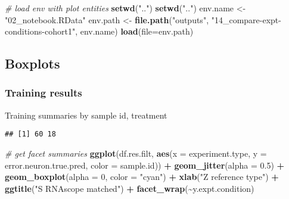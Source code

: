 \documentclass[
]{article}
\newenvironment{Shaded}{\begin{snugshade}}{\end{snugshade}}
\newcommand{\AttributeTok}[1]{\textcolor[rgb]{0.13,0.29,0.53}{#1}}
\newcommand{\CommentTok}[1]{\textcolor[rgb]{0.56,0.35,0.01}{\textit{#1}}}
\newcommand{\DecValTok}[1]{\textcolor[rgb]{0.00,0.00,0.81}{#1}}
\newcommand{\FloatTok}[1]{\textcolor[rgb]{0.00,0.00,0.81}{#1}}
\newcommand{\FunctionTok}[1]{\textcolor[rgb]{0.13,0.29,0.53}{\textbf{#1}}}
\newcommand{\NormalTok}[1]{#1}
\newcommand{\OtherTok}[1]{\textcolor[rgb]{0.56,0.35,0.01}{#1}}
\newcommand{\SpecialCharTok}[1]{\textcolor[rgb]{0.81,0.36,0.00}{\textbf{#1}}}
\newcommand{\StringTok}[1]{\textcolor[rgb]{0.31,0.60,0.02}{#1}}
\begin{document}
\begin{Shaded}
\begin{Highlighting}[]
\CommentTok{\# load env with plot entities}
\FunctionTok{setwd}\NormalTok{(}\StringTok{".."}\NormalTok{)}
\FunctionTok{setwd}\NormalTok{(}\StringTok{".."}\NormalTok{)}
\NormalTok{env.name }\OtherTok{\textless{}{-}} \StringTok{"02\_notebook.RData"}
\NormalTok{env.path }\OtherTok{\textless{}{-}} \FunctionTok{file.path}\NormalTok{(}\StringTok{"outputs"}\NormalTok{, }\StringTok{"14\_compare{-}expt{-}conditions{-}cohort1"}\NormalTok{, env.name)}
\FunctionTok{load}\NormalTok{(}\AttributeTok{file=}\NormalTok{env.path)}
\end{Highlighting}
\end{Shaded}

\hypertarget{boxplots}{%
\subsection{Boxplots}\label{boxplots}}

\hypertarget{training-results}{%
\subsubsection{Training results}\label{training-results}}

Training summaries by sample id, treatment

\begin{Shaded}
\end{Shaded}

\begin{verbatim}
## [1] 60 18
\end{verbatim}

\begin{Shaded}
\begin{Highlighting}[]
\CommentTok{\# get facet summaries}
\FunctionTok{ggplot}\NormalTok{(df.res.filt, }\FunctionTok{aes}\NormalTok{(}\AttributeTok{x =}\NormalTok{ experiment.type, }
                        \AttributeTok{y =}\NormalTok{ error.neuron.true.pred, }\AttributeTok{color =}\NormalTok{ sample.id)) }\SpecialCharTok{+} \FunctionTok{geom\_jitter}\NormalTok{(}\AttributeTok{alpha =} \FloatTok{0.5}\NormalTok{) }\SpecialCharTok{+} 
  \FunctionTok{geom\_boxplot}\NormalTok{(}\AttributeTok{alpha =} \DecValTok{0}\NormalTok{, }\AttributeTok{color =} \StringTok{"cyan"}\NormalTok{) }\SpecialCharTok{+} \FunctionTok{xlab}\NormalTok{(}\StringTok{"Z reference type"}\NormalTok{) }\SpecialCharTok{+}
  \FunctionTok{ggtitle}\NormalTok{(}\StringTok{"S RNAscope matched"}\NormalTok{) }\SpecialCharTok{+} \FunctionTok{facet\_wrap}\NormalTok{(}\SpecialCharTok{\textasciitilde{}}\NormalTok{y.expt.condition)}
\end{Highlighting}
\end{Shaded}
\end{document}
